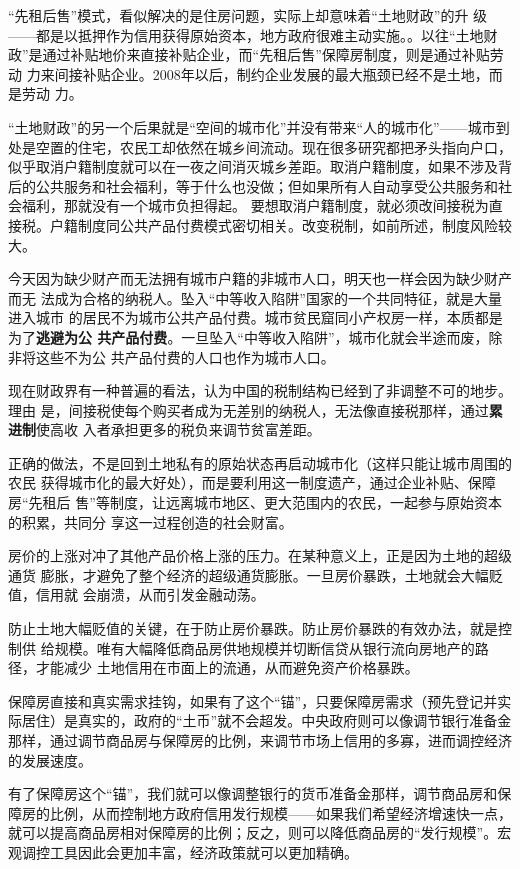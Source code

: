 “先租后售”模式，看似解决的是住房问题，实际上却意味着“土地财政”的升
级——都是以抵押作为信用获得原始资本，地方政府很难主动实施。。以往“土地财
政”是通过补贴地价来直接补贴企业，而“先租后售”保障房制度，则是通过补贴劳动
力来间接补贴企业。2008年以后，制约企业发展的最大瓶颈已经不是土地，而是劳动
力。

“土地财政”的另一个后果就是“空间的城市化”并没有带来“人的城市化”——城市到处是空置的住宅，农民工却依然在城乡间流动。现在很多研究都把矛头指向户口，似乎取消户籍制度就可以在一夜之间消灭城乡差距。取消户籍制度，如果不涉及背后的公共服务和社会福利，等于什么也没做；但如果所有人自动享受公共服务和社会福利，那就没有一个城市负担得起。
要想取消户籍制度，就必须改间接税为直接税。户籍制度同公共产品付费模式密切相关。改变税制，如前所述，制度风险较大。

今天因为缺少财产而无法拥有城市户籍的非城市人口，明天也一样会因为缺少财产而无
法成为合格的纳税人。坠入“中等收入陷阱”国家的一个共同特征，就是大量进入城市
的居民不为城市公共产品付费。城市贫民窟同小产权房一样，本质都是为了\textbf{逃避为公
  共产品付费}。一旦坠入“中等收入陷阱”，城市化就会半途而废，除非将这些不为公
共产品付费的人口也作为城市人口。

现在财政界有一种普遍的看法，认为中国的税制结构已经到了非调整不可的地步。理由
是，间接税使每个购买者成为无差别的纳税人，无法像直接税那样，通过\textbf{累进制}使高收
入者承担更多的税负来调节贫富差距。

正确的做法，不是回到土地私有的原始状态再启动城市化（这样只能让城市周围的农民
获得城市化的最大好处），而是要利用这一制度遗产，通过企业补贴、保障房“先租后
售”等制度，让远离城市地区、更大范围内的农民，一起参与原始资本的积累，共同分
享这一过程创造的社会财富。

房价的上涨对冲了其他产品价格上涨的压力。在某种意义上，正是因为土地的超级通货
膨胀，才避免了整个经济的超级通货膨胀。一旦房价暴跌，土地就会大幅贬值，信用就
会崩溃，从而引发金融动荡。

防止土地大幅贬值的关键，在于防止房价暴跌。防止房价暴跌的有效办法，就是控制供
给规模。唯有大幅降低商品房供地规模并切断信贷从银行流向房地产的路径，才能减少
土地信用在市面上的流通，从而避免资产价格暴跌。

保障房直接和真实需求挂钩，如果有了这个“锚”，只要保障房需求（预先登记并实际居住）是真实的，政府的“土币”就不会超发。中央政府则可以像调节银行准备金那样，通过调节商品房与保障房的比例，来调节市场上信用的多寡，进而调控经济的发展速度。

有了保障房这个“锚”，我们就可以像调整银行的货币准备金那样，调节商品房和保障房的比例，从而控制地方政府信用发行规模——如果我们希望经济增速快一点，就可以提高商品房相对保障房的比例；反之，则可以降低商品房的“发行规模”。宏观调控工具因此会更加丰富，经济政策就可以更加精确。

